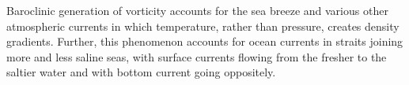 Baroclinic generation of vorticity accounts for the sea breeze and various other atmospheric currents in which temperature, rather than pressure, creates density gradients. Further, this phenomenon accounts for ocean currents in straits joining more and less saline seas, with surface currents flowing from the fresher to the saltier water and with bottom current going oppositely.

%
\begin{nomenclature}
\end{nomenclature}

